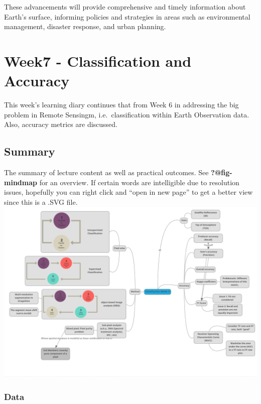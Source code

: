 \documentclass[
  letterpaper,
  DIV=11,
  numbers=noendperiod]{scrreprt}
\begin{document}
These advancements will provide comprehensive and timely information
about Earth's surface, informing policies and strategies in areas such
as environmental management, disaster response, and urban planning.


\hypertarget{week7---classification-and-accuracy}{%
\chapter{Week7 - Classification and
Accuracy}\label{week7---classification-and-accuracy}}

This week's learning diary continues that from Week 6 in addressing the
big problem in Remote Sensingm, i.e.~classification within Earth
Observation data. Also, accuracy metrics are discussed.

\hypertarget{summary-5}{%
\section{Summary}\label{summary-5}}

The summary of lecture content as well as practical outcomes. See
\textbf{?@fig-mindmap} for an overview. If certain words are
intelligible due to resolution issues, hopefully you can right click and
``open in new page'' to get a better view since this is a .SVG file.
\includegraphics{./images/MindMap.png}

\hypertarget{data}{%
\subsection{Data}\label{data}}
\end{document}
